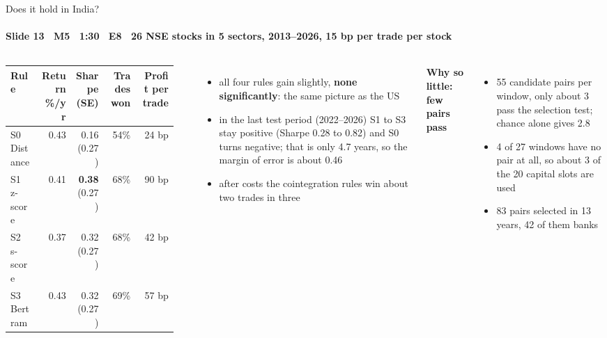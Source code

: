\begin{frame}{Does it hold in India?}
\framesubtitle{Slide 13 \textbullet\ M5 \textbullet\ 1:30 \textbullet\ E8 \textbullet\ 26 NSE stocks in 5 sectors, 2013--2026, 15 bp per trade per stock}
\vspace{-2pt}
\begin{columns}[T,onlytextwidth]
  \scriptsize\setlength{\tabcolsep}{3.5pt}
  \begin{tabular}{@{}lrrrr@{}}
    \toprule
    Rule & Return \%/yr & Sharpe (SE) & Trades won & Profit per trade \\
    \midrule
    S0 Distance & 0.43 & 0.16 (0.27) & 54\% & 24 bp \\
    S1 z-score  & 0.41 & \textbf{0.38} (0.27) & 68\% & 90 bp \\
    S2 s-score  & 0.37 & 0.32 (0.27) & 68\% & 42 bp \\
    S3 Bertram  & 0.43 & 0.32 (0.27) & 69\% & 57 bp \\
    \bottomrule
  \end{tabular}\\[4pt]
  \footnotesize\raggedright
  \begin{itemize}\setlength{\itemsep}{1pt}
    \item all four rules gain slightly, \textbf{none significantly}: the same picture as the US
    \item in the last test period (2022--2026) S1 to S3 stay positive (Sharpe 0.28 to 0.82) and S0 turns negative; that is only 4.7 years, so the margin of error is about 0.46
    \item after costs the cointegration rules win about two trades in three
  \end{itemize}
  \footnotesize\raggedright
  \textbf{\color{deckAccent}Why so little: few pairs pass}
  \begin{itemize}\setlength{\itemsep}{1pt}
    \item 55 candidate pairs per window, only about 3 pass the selection test; chance alone gives 2.8
    \item 4 of 27 windows have no pair at all, so about 3 of the 20 capital slots are used
    \item 83 pairs selected in 13 years, 42 of them banks
  \end{itemize}
\end{columns}
\end{frame}
